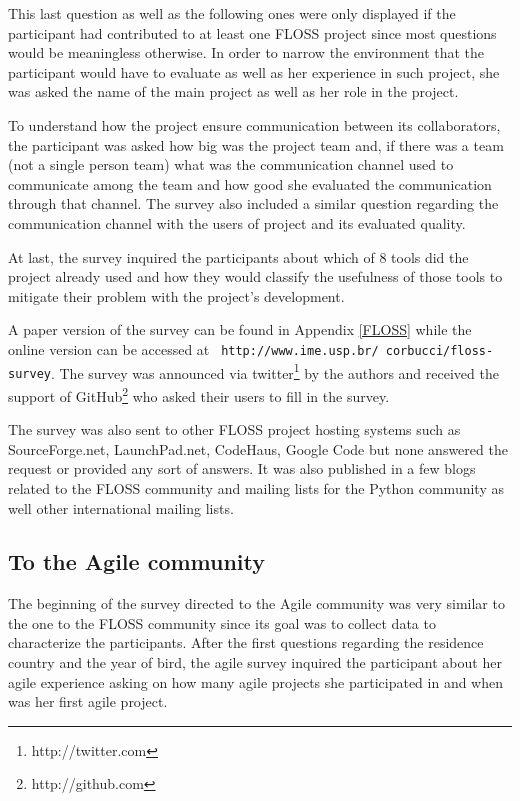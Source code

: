 \documentclass[lnbip]{svmultln}
\begin{document}
This last question as well as the following ones were only displayed
if the participant had contributed to at least one FLOSS project since
most questions would be meaningless otherwise. In order to narrow the
environment that the participant would have to evaluate as well as her
experience in such project, she was asked the name of the main project
as well as her role in the project.

To understand how the project ensure communication between its
collaborators, the participant was asked how big was the project team
and, if there was a team (not a single person team) what was the
communication channel used to communicate among the team and how good
she evaluated the communication through that channel.  The survey also
included a similar question regarding the communication channel with
the users of project and its evaluated quality.

At last, the survey inquired the participants about which of 8 tools
did the project already used and how they would classify the
usefulness of those tools to mitigate their problem with the project's
development.

A paper version of the survey can be found in Appendix \ref{FLOSS}
while the online version can be accessed at {\tt
  http://www.ime.usp.br/~corbucci/floss-survey}.  The survey was
announced via twitter\footnote{http://twitter.com} by the authors and
received the support of GitHub\footnote{http://github.com} who asked
their users to fill in the survey.

The survey was also sent to other FLOSS project hosting systems such
as SourceForge.net, LaunchPad.net, CodeHaus, Google Code but none
answered the request or provided any sort of answers.  It was also
published in a few blogs related to the FLOSS community and mailing
lists for the Python community as well other international mailing
lists.

\subsection{To the Agile community}
\label{subsec:agile-survey}

The beginning of the survey directed to the Agile community was very
similar to the one to the FLOSS community since its goal was to
collect data to characterize the participants.  After the first
questions regarding the residence country and the year of bird, the
agile survey inquired the participant about her agile experience
asking on how many agile projects she participated in and when was her
first agile project.
\end{document}
